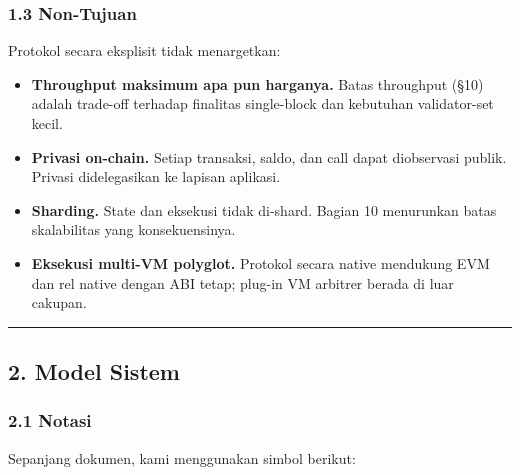 \documentclass[11pt,a4paper]{article}
\providecommand{\tightlist}{\setlength{\itemsep}{0pt}\setlength{\parskip}{0pt}}
\begin{document}
\hypertarget{non-tujuan}{%
\subsubsection{1.3 Non-Tujuan}\label{non-tujuan}}

Protokol secara eksplisit tidak menargetkan:

\begin{itemize}
\tightlist
\item
  \textbf{Throughput maksimum apa pun harganya.} Batas throughput (§10) adalah trade-off terhadap finalitas single-block dan kebutuhan validator-set kecil.
\item
  \textbf{Privasi on-chain.} Setiap transaksi, saldo, dan call dapat diobservasi publik. Privasi didelegasikan ke lapisan aplikasi.
\item
  \textbf{Sharding.} State dan eksekusi tidak di-shard. Bagian 10 menurunkan batas skalabilitas yang konsekuensinya.
\item
  \textbf{Eksekusi multi-VM polyglot.} Protokol secara native mendukung EVM dan rel native dengan ABI tetap; plug-in VM arbitrer berada di luar cakupan.
\end{itemize}

\begin{center}\rule{0.5\linewidth}{0.5pt}\end{center}

\hypertarget{model-sistem}{%
\subsection{2. Model Sistem}\label{model-sistem}}

\hypertarget{notasi}{%
\subsubsection{2.1 Notasi}\label{notasi}}

Sepanjang dokumen, kami menggunakan simbol berikut:
\end{document}
